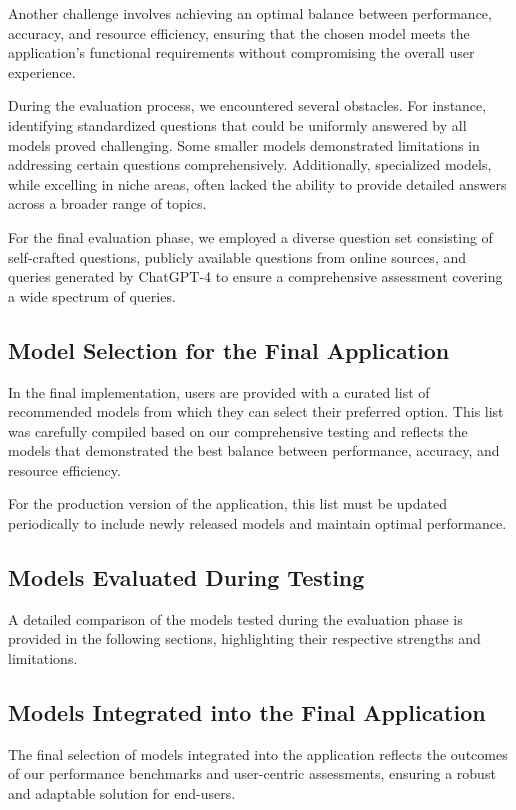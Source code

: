 Another challenge involves achieving an optimal balance between performance, accuracy, and resource efficiency, 
ensuring that the chosen model meets the application’s functional requirements without compromising the overall user experience.

During the evaluation process, we encountered several obstacles. For instance, 
identifying standardized questions that could be uniformly answered by all models proved challenging. 
Some smaller models demonstrated limitations in addressing certain questions comprehensively. Additionally, 
specialized models, while excelling in niche areas, often lacked the ability to provide detailed answers across a broader range of topics.

For the final evaluation phase, we employed a diverse question set consisting of self-crafted questions, 
publicly available questions from online sources, and queries generated by ChatGPT-4 to ensure a comprehensive assessment covering a wide spectrum of queries.

\subsection{Model Selection for the Final Application}

In the final implementation, users are provided with a curated list of recommended models from which they can select their preferred option. 
This list was carefully compiled based on our comprehensive testing and reflects the models that demonstrated 
the best balance between performance, accuracy, and resource efficiency.

For the production version of the application, 
this list must be updated periodically to include newly released models and maintain optimal performance.

\subsection{Models Evaluated During Testing}

A detailed comparison of the models tested during the evaluation phase is provided in the following sections, 
highlighting their respective strengths and limitations.

\subsection{Models Integrated into the Final Application}

The final selection of models integrated into the application reflects the outcomes of our performance benchmarks and user-centric assessments, 
ensuring a robust and adaptable solution for end-users.


